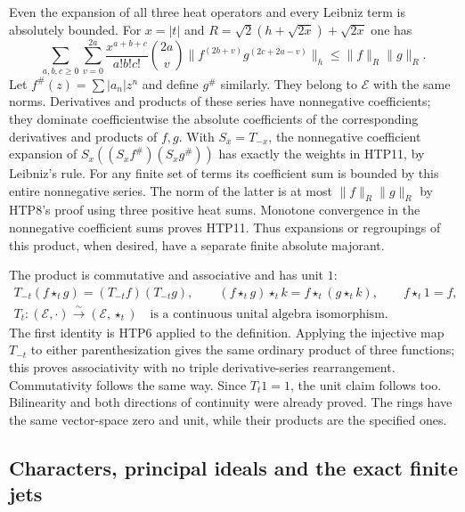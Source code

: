 Even the expansion of all three heat operators and every
Leibniz term is absolutely bounded. For $x=|t|$ and
$R=\sqrt2(h+\sqrt{2x})+\sqrt{2x}$ one has
\begin{equation}\tag{HTP11}
 \sum_{a,b,c\ge0}\sum_{v=0}^{2a}
 \frac{x^{a+b+c}}{a!b!c!}\binom{2a}{v}
 \bigl\|f^{(2b+v)}g^{(2c+2a-v)}\bigr\|_h
                         \le\|f\|_R\|g\|_R.
\end{equation}
Let $f^\#(z)=\sum|a_n|z^n$ and define $g^\#$ similarly.
They belong to $\mathcal E$ with the same norms. Derivatives
and products of these series have nonnegative coefficients;
they dominate coefficientwise the absolute coefficients of
the corresponding derivatives and products of $f,g$.
With $S_x=T_{-x}$, the nonnegative coefficient expansion of
$S_x((S_xf^\#)(S_xg^\#))$ has exactly the weights in HTP11,
by Leibniz's rule. For any finite set of terms its coefficient
sum is bounded by this entire nonnegative series. The norm of
the latter is at most $\|f\|_R\|g\|_R$ by HTP8's proof
using three positive heat sums. Monotone convergence in the
nonnegative coefficient sums proves HTP11. Thus expansions
or regroupings of this product, when desired, have a separate
finite absolute majorant.

The product is commutative and associative and has unit $1$:
\begin{equation}\tag{HTP12}
\begin{gathered}
 T_{-t}(f\star_tg)=(T_{-t}f)(T_{-t}g),\qquad
 (f\star_tg)\star_tk=f\star_t(g\star_tk),\qquad
 f\star_t1=f,\\
 T_t:(\mathcal E,\cdot)\overset{\sim}{\longrightarrow}
       (\mathcal E,\star_t)
 \quad\text{is a continuous unital algebra isomorphism.}
\end{gathered}
\end{equation}
The first identity is HTP6 applied to the definition. Applying
the injective map $T_{-t}$ to either parenthesization gives the
same ordinary product of three functions; this proves
associativity with no triple derivative-series rearrangement.
Commutativity follows the same way. Since $T_t1=1$, the unit
claim follows too. Bilinearity and both directions of continuity
were already proved. The rings have the same vector-space
zero and unit, while their products are the specified ones.

\subsection{Characters, principal ideals and the exact finite jets}

